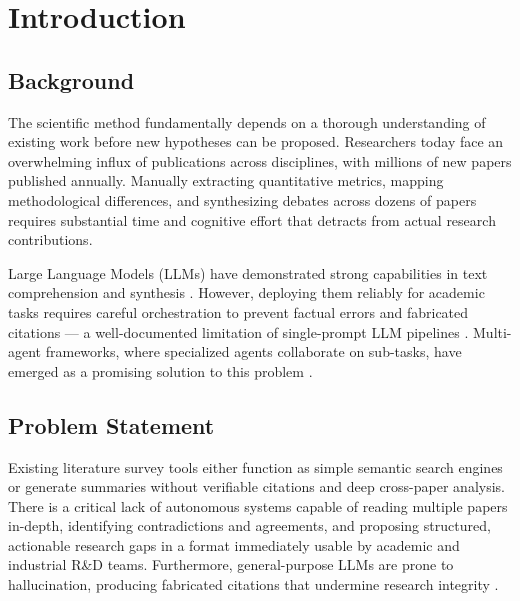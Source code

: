 \documentclass[12pt, a4paper]{article}
\begin{document}
\section{Introduction}

\subsection{Background}
The scientific method fundamentally depends on a thorough understanding of existing work
before new hypotheses can be proposed. Researchers today face an overwhelming influx of
publications across disciplines, with millions of new papers published annually. Manually
extracting quantitative metrics, mapping methodological differences, and synthesizing debates
across dozens of papers requires substantial time and cognitive effort that detracts from
actual research contributions.

Large Language Models (LLMs) have demonstrated strong capabilities in text comprehension
and synthesis \cite{brown2020gpt}. However, deploying them reliably for academic tasks
requires careful orchestration to prevent factual errors and fabricated citations --- a
well-documented limitation of single-prompt LLM pipelines \cite{ji2023hallucination}.
Multi-agent frameworks, where specialized agents collaborate on sub-tasks, have emerged as
a promising solution to this problem \cite{wu2023autogen}.

\subsection{Problem Statement}
Existing literature survey tools either function as simple semantic search engines or generate
summaries without verifiable citations and deep cross-paper analysis. There is a critical lack
of autonomous systems capable of reading multiple papers in-depth, identifying contradictions
and agreements, and proposing structured, actionable research gaps in a format immediately
usable by academic and industrial R\&D teams. Furthermore, general-purpose LLMs are prone
to hallucination, producing fabricated citations that undermine research integrity
\cite{ji2023hallucination}.
\end{document}
